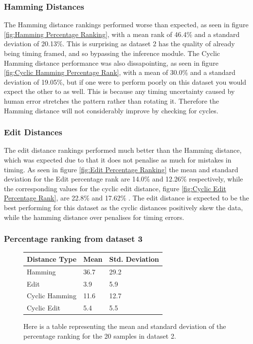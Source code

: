 \documentclass[12pt,twoside,notitlepage]{report}
\begin{document}
			\subsubsection{Hamming Distances}
			



			The Hamming distance rankings performed worse than expected, as seen in figure \ref{fig:Hamming Percentage Ranking}, with a mean rank of 46.4\% and a standard deviation of 20.13\%. This is surprising as dataset 2 has the quality of already being timing framed, and so bypassing the inference module. The Cyclic Hamming distance performance was also dissapointing, as seen in figure \ref{fig:Cyclic Hamming Percentage Rank}, with a mean of 30.0\% and a standard deviation of 19.05\%, but if one were to perform poorly on this dataset you would expect the other to as well. This is because any timing uncertainty caused by human error stretches the pattern rather than rotating it. Therefore the Hamming distance will not considerably improve by checking for cycles.
			
			\subsubsection{Edit Distances}


			The edit distance rankings performed much better than the Hamming distance, which was expected due to that it does not penalise as much for mistakes in timing. As seen in figure \ref{fig:Edit Percentage Ranking} the mean and standard deviation for the Edit percentage rank are 14.0\% and 12.26\% respectively, while the corresponding values for the cyclic edit distance, figure \ref{fig:Cyclic Edit Percentage Rank}, are 22.8\% and 17.62\% . The edit distance is expected to be the best performing for this dataset as the cyclic distances positively skew the data, while the hamming distance over penalises for timing errors. 


		\subsubsection{Percentage ranking from dataset 3}


\begin{figure}
\begin{center}
							\begin{tabu} to 0.8\textwidth {|X[c] |X[c]|X[c]|}
							\hline
							 \textbf{Distance Type}& \textbf{Mean} & \textbf{Std. Deviation} \\
							 \hline
							 Hamming& 36.7 & 29.2 \\
							 \hline
							 Edit& 3.9 & 5.9 \\
							 \hline
							 Cyclic Hamming& 11.6 & 12.7\\
							 \hline
							 Cyclic Edit& 5.4 & 5.5 \\
							 \hline
							 \end{tabu}
						\end{center}
						\caption{\label{tab:CyclicRankings} Here is a table representing the mean and standard deviation of the percentage ranking for the 20 samples in dataset 2.}
						
				\end{figure}
				
\end{document}
